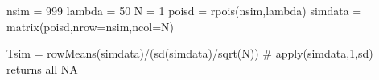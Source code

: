\documentclass[
  letterpaper,
  DIV=11,
  numbers=noendperiod]{scrartcl}
\newenvironment{Shaded}{\begin{snugshade}}{\end{snugshade}}
\newcommand{\AttributeTok}[1]{\textcolor[rgb]{0.40,0.45,0.13}{#1}}
\newcommand{\CommentTok}[1]{\textcolor[rgb]{0.37,0.37,0.37}{#1}}
\newcommand{\DecValTok}[1]{\textcolor[rgb]{0.68,0.00,0.00}{#1}}
\newcommand{\FunctionTok}[1]{\textcolor[rgb]{0.28,0.35,0.67}{#1}}
\newcommand{\NormalTok}[1]{\textcolor[rgb]{0.00,0.23,0.31}{#1}}
\newcommand{\OtherTok}[1]{\textcolor[rgb]{0.00,0.23,0.31}{#1}}
\newcommand{\SpecialCharTok}[1]{\textcolor[rgb]{0.37,0.37,0.37}{#1}}
\begin{document}
\begin{Shaded}
\begin{Highlighting}[]
\NormalTok{nsim }\OtherTok{=} \DecValTok{999}
\NormalTok{lambda }\OtherTok{=} \DecValTok{50}
\NormalTok{N }\OtherTok{=} \DecValTok{1}
\NormalTok{poisd }\OtherTok{=} \FunctionTok{rpois}\NormalTok{(nsim,lambda)}
\NormalTok{simdata }\OtherTok{=} \FunctionTok{matrix}\NormalTok{(poisd,}\AttributeTok{nrow=}\NormalTok{nsim,}\AttributeTok{ncol=}\NormalTok{N)}

\NormalTok{Tsim }\OtherTok{=} \FunctionTok{rowMeans}\NormalTok{(simdata)}\SpecialCharTok{/}\NormalTok{(}\FunctionTok{sd}\NormalTok{(simdata)}\SpecialCharTok{/}\FunctionTok{sqrt}\NormalTok{(N))  }\CommentTok{\# apply(simdata,1,sd) returns all NA}
\end{Highlighting}
\end{Shaded}
\end{document}

